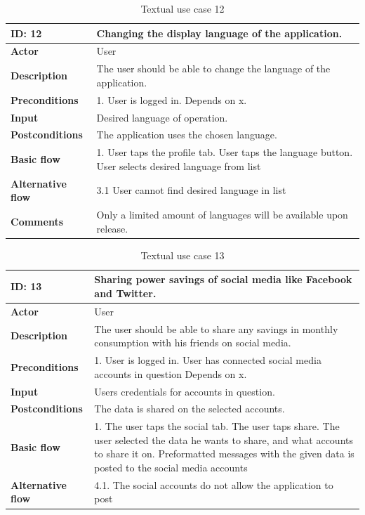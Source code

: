 \begin{table}[H]
\begin{tabular}{|l|p{11.7cm}|}
\hline
\textbf{ID: }12&\textbf{Changing the display language of the application.}
\\\hline
\textbf{Actor} &User
\\\hline
\textbf{Description}&
The user should be able to change the language of the application.\\\hline
\textbf{Preconditions}&
1. User is logged in.\newline
Depends on x.\\\hline
\textbf{Input}&
Desired language of operation.\\\hline
\textbf{Postconditions}& 
The application uses the chosen language.\\\hline
\textbf{Basic flow}&
1. User taps the profile tab\newline
2. User taps the language button\newline
3. User selects desired language from list
\\\hline
\textbf{Alternative flow}&
3.1 User cannot find desired language in list
\\\hline
\textbf{Comments}&Only a limited amount of languages will be available upon release. \\\hline
\end{tabular}
\caption{Textual use case 12}
\end{table}


\begin{table}[H]
\begin{tabular}{|l|p{11.7cm}|}
\hline
\textbf{ID: }13&\textbf{Sharing power savings of social media like Facebook and Twitter.}
\\\hline
\textbf{Actor} &User
\\\hline
\textbf{Description}&
The user should be able to share any savings in monthly consumption with his friends on social media.\\\hline
\textbf{Preconditions}&
1. User is logged in\newline
2. User has connected social media accounts in question\newline
Depends on x.\\\hline
\textbf{Input}&
Users credentials for accounts in question.\\\hline
\textbf{Postconditions}& 
The data is shared on the selected accounts. \\\hline
\textbf{Basic flow}&
1. The user taps the social tab\newline
2. The user taps share\newline
3. The user selected the data he wants to share, and what accounts to share it on\newline
4. Preformatted messages with the given data is posted to the social media accounts
\\\hline
\textbf{Alternative flow}&
4.1. The social accounts do not allow the application to post
\\\hline
\end{tabular}
\caption{Textual use case 13}
\end{table}

